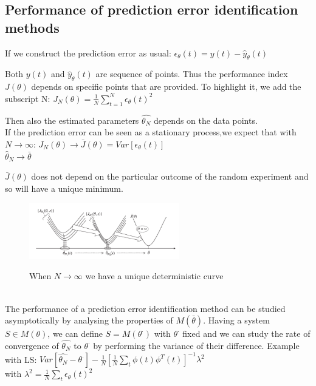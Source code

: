 \documentclass[10pt,a4paper]{article}
\begin{document}
\subsection{Performance of prediction error identification methods}
If we construct the prediction error as usual:
\center
	$\epsilon_\theta(t)=y(t)-\hat{y}_\theta(t)$
\\ \raggedright
Both $y(t)$ and $\hat{y}_\theta(t)$ are sequence of points. Thus the performance index $J(\theta)$ depends on specific points that are provided. To highlight it, we add the subscript N:
\center
	$J_N(\theta) = \frac{1}{N}\sum_{t=1}^N\epsilon_\theta(t)^2$
\\ \raggedright \vspace{0.5em}
Then also the estimated parameters $\hat{\theta_N}$ depends on the data points. \\If the prediction error can be seen as a stationary process,we expect that with $N \rightarrow \infty$:
\center $J_N(\theta) \rightarrow \bar{J}(\theta)=Var[\epsilon_\theta(t)]$\\  $\hat{\theta}_N \rightarrow \bar{\theta}$
\\ \raggedright \vspace{0.3em}
$\bar{J}(\theta)$ does not depend on the particular outcome of the random experiment and so will have a unique minimum.
 \begin{figure}[h!]
 \hfill \includegraphics[width=185pt]{images/pem.png}\hspace*{\fill}
  \label{fig:pem}
  \caption{When $N \rightarrow \infty$ we have a unique deterministic curve}
\end{figure} \\
The performance of a prediction error identification method can be studied asymptotically by analysing the properties of $M(\bar{\theta})$. Having a system $S \in M(\theta)$, we can define $S=M(\theta^\cdot)$ with $\theta^\cdot$ fixed and we can study the rate of convergence of $\hat{\theta_N}$ to $\theta^\cdot$ by performing the variance of their difference. Example with LS:
\center
$Var[\hat{\theta_N} - \theta^\cdot] - \frac{1}{N}[\frac{1}{N}\sum_t\phi(t)\phi^T(t)]^{-1}\lambda^2$ \\ \vspace{1em}
with $\lambda^2=\frac{1}{N}\sum_t\epsilon_\theta(t)^2$ 
\\ \raggedright
\end{document}
